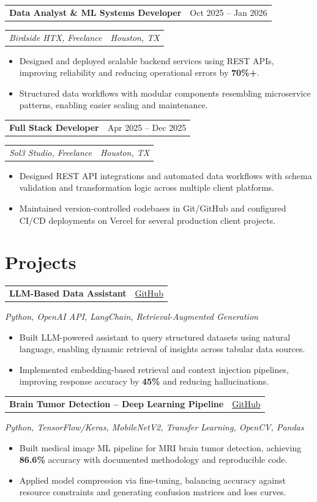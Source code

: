 \documentclass[10pt,letterpaper]{article}
\makeatletter
\newcommand{\roleheading}[2]{%
  \begin{tabularx}{\linewidth}{@{}X r@{}}
    \textbf{\small\color{dark}#1} & \small\textcolor{muted}{#2}
  \end{tabularx}\vspace{-1pt}\par
}
\newcommand{\orgline}[2]{%
  \begin{tabularx}{\linewidth}{@{}X r@{}}
    \textit{\footnotesize\textcolor{muted}{#1}} &
    \textit{\footnotesize\textcolor{muted}{#2}}
  \end{tabularx}\vspace{1pt}\par
}
\newcommand{\toolsline}[1]{%
  \textit{\footnotesize\textcolor{muted}{#1}}\vspace{1pt}\par
}
\makeatother
\begin{document}
\vspace{2pt}

\roleheading{Data Analyst \& ML Systems Developer}{Oct 2025 -- Jan 2026}
\orgline{Birdside HTX, Freelance}{Houston, TX}
\begin{itemize}\footnotesize
  \item Designed and deployed scalable backend services using REST APIs, improving reliability and reducing operational errors by \textbf{70\%+}.
  \item Structured data workflows with modular components resembling microservice patterns, enabling easier scaling and maintenance.
\end{itemize}

\vspace{2pt}

\roleheading{Full Stack Developer}{Apr 2025 -- Dec 2025}
\orgline{Sol3 Studio, Freelance}{Houston, TX}
\begin{itemize}\footnotesize
  \item Designed REST API integrations and automated data workflows with schema validation and transformation logic across multiple client platforms.
  \item Maintained version-controlled codebases in Git/GitHub and configured CI/CD deployments on Vercel for several production client projects.
\end{itemize}

\section{Projects}

\roleheading{LLM-Based Data Assistant}{\href{https://github.com/jonathanrao99}{GitHub}}
\toolsline{Python, OpenAI API, LangChain, Retrieval-Augmented Generation}
\begin{itemize}\footnotesize
  \item Built LLM-powered assistant to query structured datasets using natural language, enabling dynamic retrieval of insights across tabular data sources.
  \item Implemented embedding-based retrieval and context injection pipelines, improving response accuracy by \textbf{45\%} and reducing hallucinations.
\end{itemize}

\vspace{2pt}

\roleheading{Brain Tumor Detection -- Deep Learning Pipeline}{\href{https://github.com/jonathanrao99}{GitHub}}
\toolsline{Python, TensorFlow/Keras, MobileNetV2, Transfer Learning, OpenCV, Pandas}
\begin{itemize}\footnotesize
  \item Built medical image ML pipeline for MRI brain tumor detection, achieving \textbf{86.6\%} accuracy with documented methodology and reproducible code.
  \item Applied model compression via fine-tuning, balancing accuracy against resource constraints and generating confusion matrices and loss curves.
\end{itemize}
\end{document}
